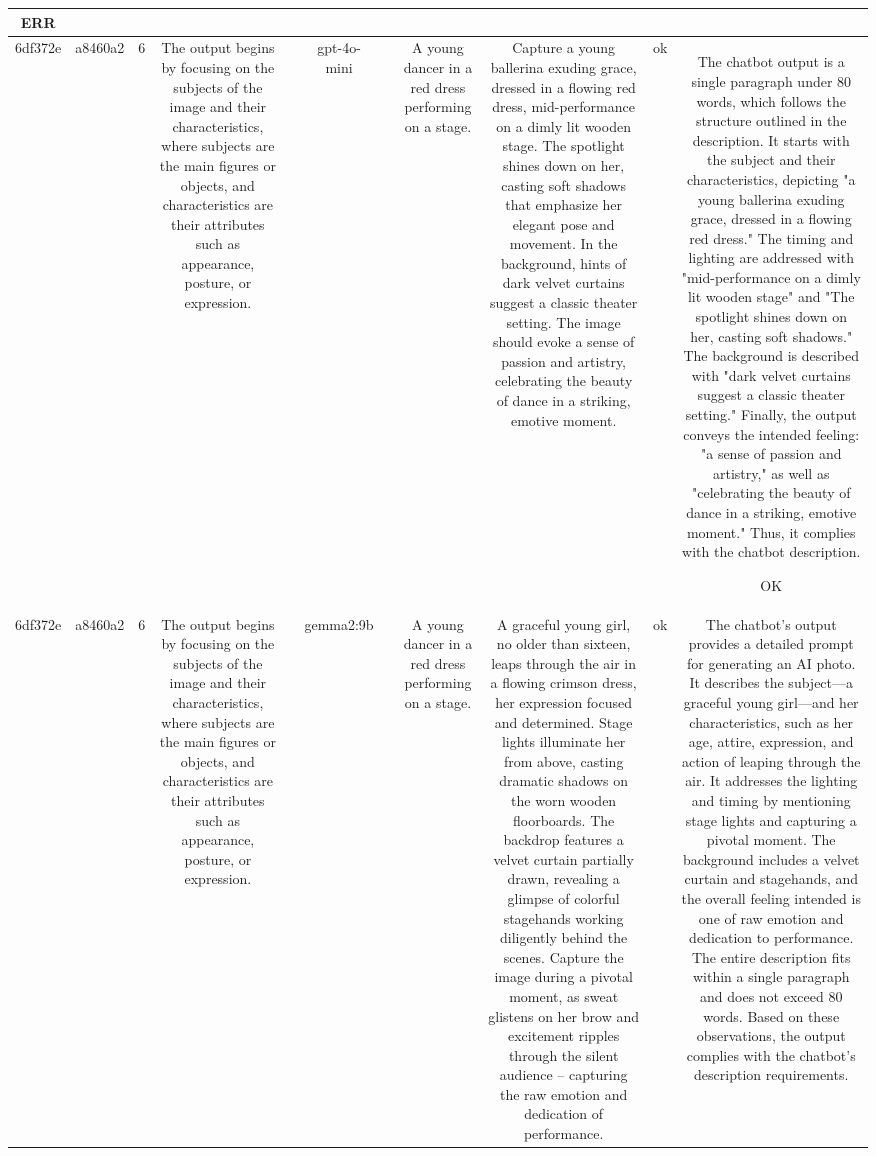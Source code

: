 \begin{table}[h!]
\begin{tabular}{|c|c|c|c|c|c|c|c|c|c|c|}
ERR\\
\hline
6df372e & a8460a2 & 6 & The output begins by focusing on the subjects of the image and their characteristics, where subjects are the main figures or objects, and characteristics are their attributes such as appearance, posture, or expression. &  & gpt-4o-mini &  & A young dancer in a red dress performing on a stage. & Capture a young ballerina exuding grace, dressed in a flowing red dress, mid-performance on a dimly lit wooden stage. The spotlight shines down on her, casting soft shadows that emphasize her elegant pose and movement. In the background, hints of dark velvet curtains suggest a classic theater setting. The image should evoke a sense of passion and artistry, celebrating the beauty of dance in a striking, emotive moment. & ok & The chatbot output is a single paragraph under 80 words, which follows the structure outlined in the description. It starts with the subject and their characteristics, depicting "a young ballerina exuding grace, dressed in a flowing red dress." The timing and lighting are addressed with "mid-performance on a dimly lit wooden stage" and "The spotlight shines down on her, casting soft shadows." The background is described with "dark velvet curtains suggest a classic theater setting." Finally, the output conveys the intended feeling: "a sense of passion and artistry," as well as "celebrating the beauty of dance in a striking, emotive moment." Thus, it complies with the chatbot description.

OK\\
\hline
6df372e & a8460a2 & 6 & The output begins by focusing on the subjects of the image and their characteristics, where subjects are the main figures or objects, and characteristics are their attributes such as appearance, posture, or expression. &  & gemma2:9b &  & A young dancer in a red dress performing on a stage. & A graceful young girl, no older than sixteen, leaps through the air in a flowing crimson dress, her expression focused and determined.  Stage lights illuminate her from above, casting dramatic shadows on the worn wooden floorboards. The backdrop features a velvet curtain partially drawn, revealing a glimpse of colorful stagehands working diligently behind the scenes. Capture the image during a pivotal moment, as sweat glistens on her brow and excitement ripples through the silent audience – capturing the raw emotion and dedication of performance. 


 & ok & The chatbot's output provides a detailed prompt for generating an AI photo. It describes the subject—a graceful young girl—and her characteristics, such as her age, attire, expression, and action of leaping through the air. It addresses the lighting and timing by mentioning stage lights and capturing a pivotal moment. The background includes a velvet curtain and stagehands, and the overall feeling intended is one of raw emotion and dedication to performance. The entire description fits within a single paragraph and does not exceed 80 words. Based on these observations, the output complies with the chatbot's description requirements.


\end{tabular}
\end{table}
